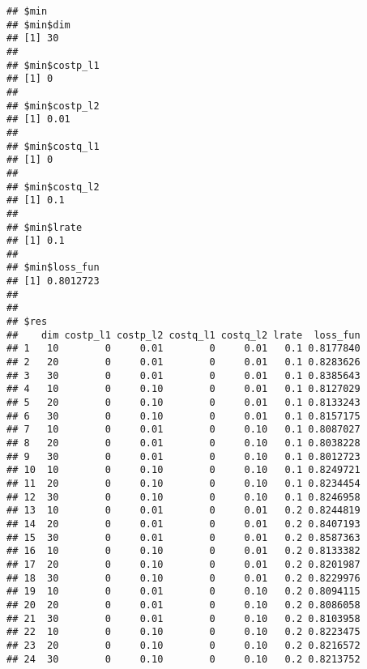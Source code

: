 \documentclass[
]{article}
\newenvironment{Shaded}{\begin{snugshade}}{\end{snugshade}}
\newcommand{\CommentTok}[1]{\textcolor[rgb]{0.56,0.35,0.01}{\textit{#1}}}
\newcommand{\DataTypeTok}[1]{\textcolor[rgb]{0.13,0.29,0.53}{#1}}
\newcommand{\DecValTok}[1]{\textcolor[rgb]{0.00,0.00,0.81}{#1}}
\newcommand{\KeywordTok}[1]{\textcolor[rgb]{0.13,0.29,0.53}{\textbf{#1}}}
\newcommand{\NormalTok}[1]{#1}
\newcommand{\OperatorTok}[1]{\textcolor[rgb]{0.81,0.36,0.00}{\textbf{#1}}}
\begin{document}
\begin{verbatim}
## $min
## $min$dim
## [1] 30
## 
## $min$costp_l1
## [1] 0
## 
## $min$costp_l2
## [1] 0.01
## 
## $min$costq_l1
## [1] 0
## 
## $min$costq_l2
## [1] 0.1
## 
## $min$lrate
## [1] 0.1
## 
## $min$loss_fun
## [1] 0.8012723
## 
## 
## $res
##    dim costp_l1 costp_l2 costq_l1 costq_l2 lrate  loss_fun
## 1   10        0     0.01        0     0.01   0.1 0.8177840
## 2   20        0     0.01        0     0.01   0.1 0.8283626
## 3   30        0     0.01        0     0.01   0.1 0.8385643
## 4   10        0     0.10        0     0.01   0.1 0.8127029
## 5   20        0     0.10        0     0.01   0.1 0.8133243
## 6   30        0     0.10        0     0.01   0.1 0.8157175
## 7   10        0     0.01        0     0.10   0.1 0.8087027
## 8   20        0     0.01        0     0.10   0.1 0.8038228
## 9   30        0     0.01        0     0.10   0.1 0.8012723
## 10  10        0     0.10        0     0.10   0.1 0.8249721
## 11  20        0     0.10        0     0.10   0.1 0.8234454
## 12  30        0     0.10        0     0.10   0.1 0.8246958
## 13  10        0     0.01        0     0.01   0.2 0.8244819
## 14  20        0     0.01        0     0.01   0.2 0.8407193
## 15  30        0     0.01        0     0.01   0.2 0.8587363
## 16  10        0     0.10        0     0.01   0.2 0.8133382
## 17  20        0     0.10        0     0.01   0.2 0.8201987
## 18  30        0     0.10        0     0.01   0.2 0.8229976
## 19  10        0     0.01        0     0.10   0.2 0.8094115
## 20  20        0     0.01        0     0.10   0.2 0.8086058
## 21  30        0     0.01        0     0.10   0.2 0.8103958
## 22  10        0     0.10        0     0.10   0.2 0.8223475
## 23  20        0     0.10        0     0.10   0.2 0.8216572
## 24  30        0     0.10        0     0.10   0.2 0.8213752
\end{verbatim}

\begin{Shaded}
\end{Shaded}
\end{document}
